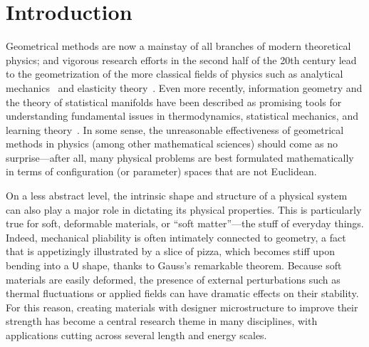 
\chapter{Introduction}


Geometrical methods are now a mainstay of all branches of modern theoretical physics;
and vigorous research efforts in the second half of the 20th century lead to the geometrization of the more classical fields of physics such as analytical mechanics~\cite{sudarshan1974,arnold1978,souder2017} and elasticity theory~\cite{marsden1994,audoly2010}.
Even more recently, information geometry and the theory of statistical manifolds have been described as promising tools for understanding fundamental issues in thermodynamics, statistical mechanics, and learning theory~\cite{ruppeiner1995}.
In some sense, the unreasonable effectiveness of geometrical methods in physics (among other mathematical sciences) should come as no surprise---after all, many physical problems are best formulated mathematically in terms of configuration (or parameter) spaces that are not Euclidean.

On a less abstract level, the intrinsic shape and structure of a physical system can also play a major role in dictating its physical properties.
This is particularly true for soft, deformable materials, or ``soft matter''---the stuff of everyday things.
Indeed, mechanical pliability is often intimately connected to geometry, a fact that is appetizingly illustrated by a slice of pizza, which becomes stiff upon bending into a $\textsf{U}$ shape, thanks to Gauss's remarkable theorem.
Because soft materials are easily deformed, the presence of external perturbations such as thermal fluctuations or applied fields can have dramatic effects on their stability.
For this reason, creating materials with designer microstructure to improve their strength has become a central research theme in many disciplines, with applications cutting across several length and energy scales.

